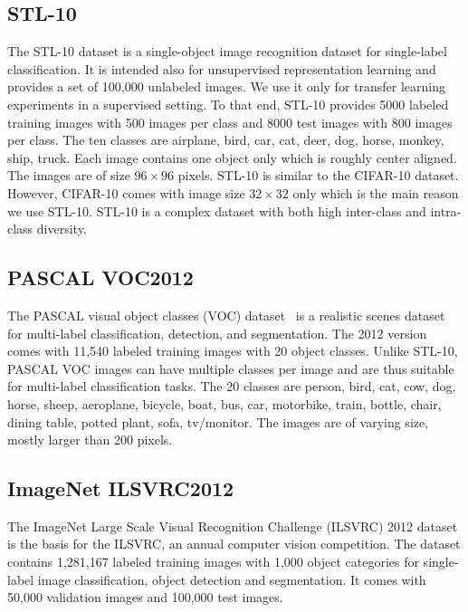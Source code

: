 \documentclass[a4paper,12pt]{report}
\begin{document}
\subsection{STL-10}
The STL-10 \cite{singleLayerNetworks} dataset is a single-object image recognition dataset for single-label classification. It is intended also for unsupervised representation learning and provides a set of 100,000 unlabeled images. We use it only for transfer learning experiments in a supervised setting. To that end, STL-10 provides 5000 labeled training images with 500 images per class and 8000 test images with 800 images per class. The ten classes are airplane, bird, car, cat, deer, dog, horse, monkey, ship, truck. Each image contains one object only which is roughly center aligned. The images are of size $96 \times 96$ pixels. STL-10 is similar to the CIFAR-10 dataset. However, CIFAR-10 comes with image size $32 \times 32$ only which is the main reason we use STL-10. STL-10 is a complex dataset with both high inter-class and intra-class diversity.


\subsection{PASCAL VOC2012}
The PASCAL visual object classes (VOC) dataset~\cite{PascalVocDataset} is a realistic scenes dataset for multi-label classification, detection, and segmentation. The 2012 version comes with 11,540 labeled training images with 20 object classes. Unlike STL-10, PASCAL VOC images can have multiple classes per image and are thus suitable for multi-label classification tasks. The 20 classes are person, bird, cat, cow, dog, horse, sheep, aeroplane, bicycle, boat, bus, car, motorbike, train, bottle, chair, dining table, potted plant, sofa, tv/monitor. The images are of varying size, mostly larger than 200 pixels.


\subsection{ImageNet ILSVRC2012}
The ImageNet Large Scale Visual Recognition Challenge (ILSVRC) 2012 dataset \cite{ILSVRC2012} is the basis for the ILSVRC, an annual computer vision competition. The dataset contains 1,281,167 labeled training images with 1,000 object categories for single-label image classification, object detection and segmentation. It comes with 50,000 validation images and 100,000 test images. 

\end{document}
